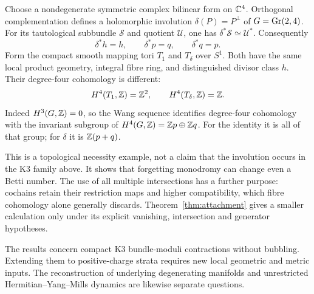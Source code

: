 Choose a nondegenerate symmetric complex bilinear form on
\(\mathbb C^4\). Orthogonal complementation defines a holomorphic
involution \(\delta(P)=P^\perp\) of \(G=\operatorname{Gr}(2,4)\).
For its tautological subbundle \(\mathcal S\) and quotient
\(\mathcal U\), one has
\(\delta^*\mathcal S\simeq\mathcal U^*\). Consequently
\[
 \delta^*h=h,\qquad \delta^*p=q,\qquad \delta^*q=p .
\]
Form the compact smooth mapping tori \(T_1\) and \(T_\delta\)
over \(S^1\). Both have the same local product geometry,
integral fibre ring, and distinguished divisor class \(h\).
Their degree-four cohomology is different:
\begin{equation}\label{eq:monodromy}
 H^4(T_1,\mathbb Z)=\mathbb Z^2,\qquad H^4(T_\delta,\mathbb Z)=\mathbb Z .
\end{equation}
Indeed \(H^3(G,\mathbb Z)=0\), so the Wang sequence identifies
degree-four cohomology with the invariant subgroup of
\(H^4(G,\mathbb Z)=\mathbb Z p\oplus\mathbb Z q\). For the identity it is all of
that group; for \(\delta\) it is \(\mathbb Z(p+q)\).

This is a topological necessity example, not a claim that
the involution occurs in the K3 family above. It shows that
forgetting monodromy can change even a Betti number.
The use of all multiple intersections has a further purpose:
cochains retain their restriction maps and higher compatibility,
which fibre cohomology alone generally discards.
Theorem~\ref{thm:attachment} gives a smaller calculation only
under its explicit vanishing, intersection and generator
hypotheses.

The results concern compact K3 bundle-moduli contractions
without bubbling. Extending them to positive-charge strata
requires new local geometric and metric inputs. The
reconstruction of underlying degenerating manifolds and
unrestricted Hermitian--Yang--Mills dynamics are likewise
separate questions.
